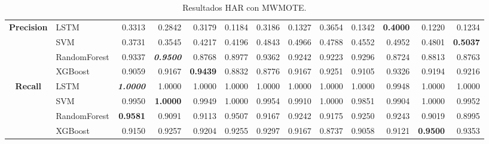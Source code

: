 \begin{table}[H]
\begin{adjustbox}{max width=12cm}
\begin{tabular}{|c|l|r|r|r|r|r|r|r|r|r|r|r|}
			\hline
			\textbf{Precision} &  LSTM &  0.3313 &  0.2842 &  0.3179 &  0.1184 &  0.3186 &  0.1327 &  0.3654 &  0.1342 & \textbf{  0.4000 } &  0.1220 &  0.1234 \\
			&  SVM &  0.3731 &  0.3545 &  0.4217 &  0.4196 &  0.4843 &  0.4966 &  0.4788 &  0.4552 &  0.4952 &  0.4801 & \textbf{  0.5037 } \\
			&  RandomForest &  0.9337 & \textit{ \textbf{  0.9500 } } &  0.8768 &  0.8977 &  0.9362 &  0.9242 &  0.9223 &  0.9296 &  0.8724 &  0.8813 &  0.8763 \\
			&  XGBoost &  0.9059 &  0.9167 & \textbf{  0.9439 } &  0.8832 &  0.8776 &  0.9167 &  0.9251 &  0.9105 &  0.9326 &  0.9194 &  0.9216 \\
			\hline
			\textbf{Recall} &  LSTM & \textit{ \textbf{  1.0000 } } &  1.0000 &  1.0000 &  1.0000 &  1.0000 &  1.0000 &  1.0000 &  1.0000 &  0.9948 &  1.0000 &  1.0000 \\
			&  SVM &  0.9950 & \textbf{  1.0000 } &  0.9949 &  1.0000 &  0.9954 &  0.9910 &  1.0000 &  0.9851 &  0.9904 &  1.0000 &  0.9952 \\
			&  RandomForest & \textbf{  0.9581 } &  0.9091 &  0.9113 &  0.9507 &  0.9167 &  0.9242 &  0.9175 &  0.9250 &  0.9243 &  0.9019 &  0.8995 \\
			&  XGBoost &  0.9150 &  0.9257 &  0.9204 &  0.9255 &  0.9297 &  0.9167 &  0.8737 &  0.9058 &  0.9121 & \textbf{  0.9500 } &  0.9353 \\
			\hline
		\end{tabular}
	\end{adjustbox}
	\caption{Resultados HAR con MWMOTE.}
	\label{tab:HAR_MWMOTE}
\end{table}


